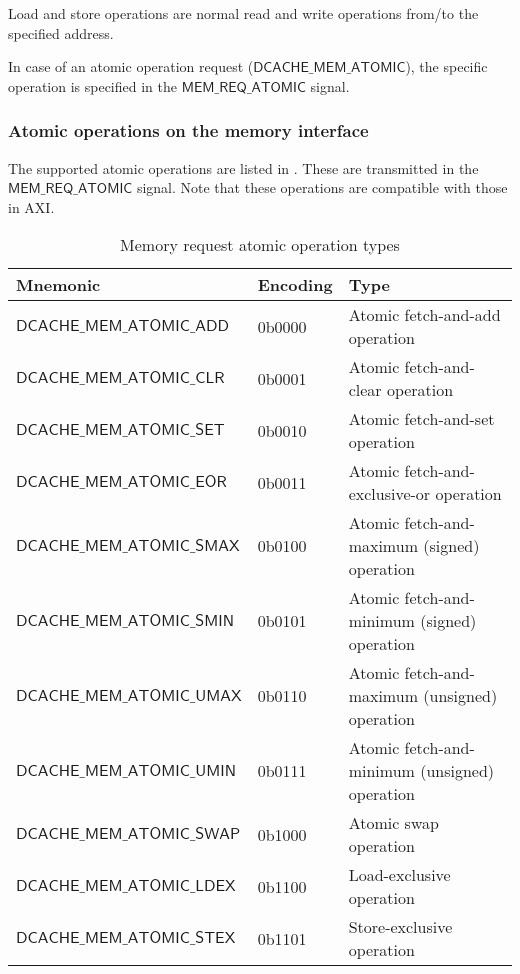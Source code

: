 \documentclass[10pt,titlepage,twoside]{book}
\begin{document}
Load and store operations are normal read and write operations from/to the specified address.

In case of an atomic operation request ($\mathsf{DCACHE\_MEM\_ATOMIC}$), the specific operation is specified in the $\mathsf{MEM\_REQ\_ATOMIC}$ signal.


\subsubsection{Atomic operations on the memory interface}

The supported atomic operations are listed in .
These are transmitted in the $\mathsf{MEM\_REQ\_ATOMIC}$ signal.
Note that these operations are compatible with those in AXI.

\begin{table}[h!]
\begin{center}
\caption{Memory request atomic operation types}%
{\footnotesize
\begin{tabular}{lll}
  \toprule
  \textbf{Mnemonic}
  & \textbf{Encoding}
  & \textbf{Type} \\
  \midrule
  $\mathsf{DCACHE\_MEM\_ATOMIC\_ADD}$
  & 0b0000
  & Atomic fetch-and-add operation \\
  \midrule
  $\mathsf{DCACHE\_MEM\_ATOMIC\_CLR}$
  & 0b0001
  & Atomic fetch-and-clear operation \\
  \midrule
  $\mathsf{DCACHE\_MEM\_ATOMIC\_SET}$
  & 0b0010
  & Atomic fetch-and-set operation \\
  \midrule
  $\mathsf{DCACHE\_MEM\_ATOMIC\_EOR}$
  & 0b0011
  & Atomic fetch-and-exclusive-or operation \\
  \midrule
  $\mathsf{DCACHE\_MEM\_ATOMIC\_SMAX}$
  & 0b0100
  & Atomic fetch-and-maximum (signed) operation \\
  \midrule
  $\mathsf{DCACHE\_MEM\_ATOMIC\_SMIN}$
  & 0b0101
  & Atomic fetch-and-minimum (signed) operation \\
  \midrule
  $\mathsf{DCACHE\_MEM\_ATOMIC\_UMAX}$
  & 0b0110
  & Atomic fetch-and-maximum (unsigned) operation \\
  \midrule
  $\mathsf{DCACHE\_MEM\_ATOMIC\_UMIN}$
  & 0b0111
  & Atomic fetch-and-minimum (unsigned) operation \\
  \midrule
  $\mathsf{DCACHE\_MEM\_ATOMIC\_SWAP}$
  & 0b1000
  & Atomic swap operation \\
  \midrule
  $\mathsf{DCACHE\_MEM\_ATOMIC\_LDEX}$
  & 0b1100
  & Load-exclusive operation \\
  \midrule
  $\mathsf{DCACHE\_MEM\_ATOMIC\_STEX}$
  & 0b1101
  & Store-exclusive operation \\
\end{tabular}}
\end{center}
\end{table}
\end{document}
